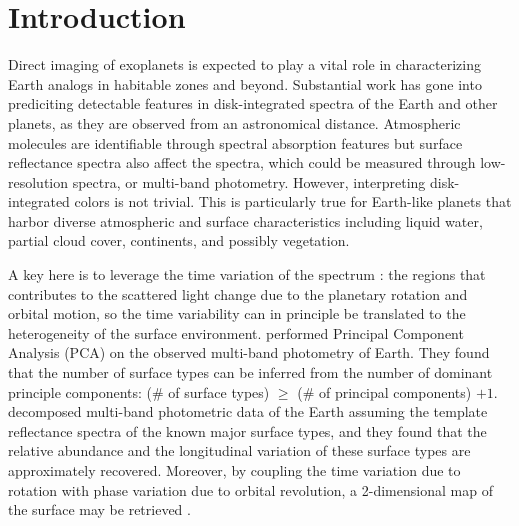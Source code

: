 \documentclass[iop,numberedappendix,apj,]{emulateapj}
\begin{document}
  



\section{Introduction}
\label{sec:intro}

Direct imaging of exoplanets is expected to play a vital role in characterizing Earth analogs in habitable zones and beyond. 
Substantial work has gone into prediciting detectable features in disk-integrated spectra of the Earth and other planets, as they are observed from an astronomical distance. 
Atmospheric molecules are identifiable through spectral absorption features \citep[e.g.,][]{DesMarais2002} but surface reflectance spectra also affect the spectra, which could be measured through low-resolution spectra, or multi-band photometry. 
However, interpreting disk-integrated colors is not trivial. 
This is particularly true for Earth-like planets that harbor diverse atmospheric and surface characteristics including liquid water, partial cloud cover, continents, and possibly vegetation. 

A key here is to leverage the time variation of the spectrum \citep{Ford2001}: the regions that contributes to the scattered light change due to the planetary rotation and  orbital motion, so the time variability can in principle be translated to the heterogeneity of the surface environment.  
\citet{Cowan2009, Cowan2011} performed Principal Component Analysis (PCA) on the observed multi-band photometry of Earth. They found that the number of surface types can be inferred from the number of dominant principle components: (\# of surface types) $\ge $ (\# of principal components) $+ 1$. %
\citet{Fujii2010, Fujii2011} decomposed multi-band photometric data of the Earth assuming the template reflectance spectra of the known major surface types, and they found that the relative abundance and the longitudinal variation of these surface types are approximately recovered. 
Moreover, by coupling the time variation due to rotation with phase variation due to orbital revolution, a 2-dimensional map of the surface may be retrieved \citep{Kawahara2010, Kawahara2011, Fujii2012}. 
\end{document}
